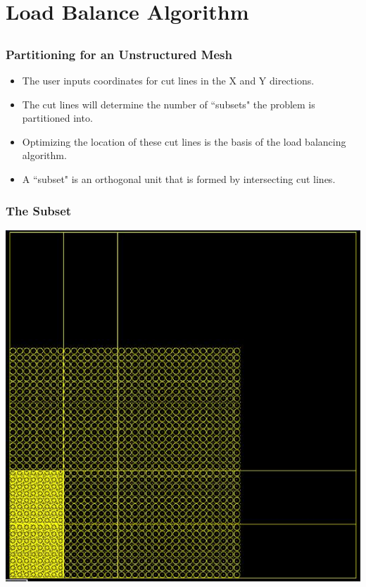 \documentclass[]{beamer}
\begin{document}
\section{Load Balance Algorithm}
\subsection{}

\begin{frame}[t]\frametitle{Partitioning for an Unstructured Mesh}
\begin{block}{}
	\begin{itemize}
	\item The user inputs coordinates for cut lines in the X and Y directions.
	\item The cut lines will determine the number of ``subsets" the problem is partitioned into.
	\item Optimizing the location of these cut lines is the basis of the load balancing algorithm.
	\item A ``subset" is an orthogonal unit that is formed by intersecting cut lines.
	\end{itemize}
\end{block}
\end{frame}

\begin{frame}[t]\frametitle{The Subset}
\centering
\includegraphics[width = 12 cm, height = 7 cm ]{figures/subsetlattice.png}
\end{frame}
\end{document}

